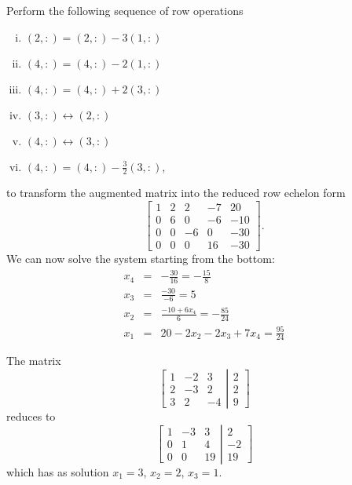 \vspace{2mm}
Perform the following sequence of row operations
\begin{enumerate}[i)]
\item $(2,:) = (2,:) - 3(1,:)$
\item $(4,:) = (4,:) - 2(1,:)$
\item $(4,:) = (4,:) + 2(3,:)$
\item $(3,:) \leftrightarrow (2,:)$
\item $(4,:) \leftrightarrow (3,:)$
\item $(4,:) = (4,:) - \frac{3}{2}(3,:)$,
\end{enumerate}
to transform the augmented matrix into the reduced row echelon form
$$
\left[\begin{array}{cccc|c}
     1 & 2 & 2 & -7 & 20 \\
		 0 & 6 & 0 & -6 & -10\\
		 0 & 0 & -6 & 0  & -30\\
		 0 & 0 & 0 & 16 & -30
      \end{array}\right].
$$
We can now solve the system starting from the bottom:
\begin{eqnarray*}
x_4 &=& -\frac{30}{16} = -\frac{15}{8} \\
x_3 &=& \frac{-30}{-6} = 5 \\
x_2 &=& \frac{-10 + 6x_4}{6} = -\frac{85}{24} \\
x_1 &=& 20 - 2x_2 - 2x_3 + 7x_4 = \frac{95}{24}
\end{eqnarray*}

\vspace{2mm}
The matrix 
\[
\left[
\begin{array}{ccc}
1&-2&3 \\
2&-3&2 \\
3&2&-4 
\end{array} \right| \left.
\begin{array}{c}
2 \\ 2 \\ 9
\end{array}
\right]
\]
reduces to
\[
\left[
\begin{array}{ccc}
1&-3&3 \\
0&1&4 \\
0&0&19
\end{array} \right| \left.
\begin{array}{c}
2 \\ -2 \\ 19
\end{array}
\right]
\]
which has as solution
$x_1=3$, $x_2=2$, $x_3=1$.

